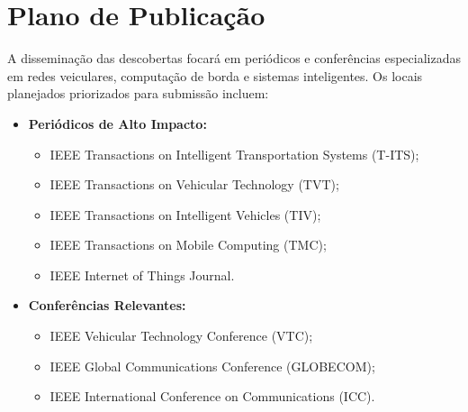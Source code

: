 \section{Plano de Publicação}
\label{sec:plano-publicacao}

A disseminação das descobertas focará em periódicos e conferências especializadas em redes veiculares, computação de borda e sistemas inteligentes. Os locais planejados priorizados para submissão incluem:

\begin{itemize}
    \item \textbf{Periódicos de Alto Impacto:}
    \begin{itemize}
        \item IEEE Transactions on Intelligent Transportation Systems (T-\gls{ITS});
        \item IEEE Transactions on Vehicular Technology (TVT);
        \item IEEE Transactions on Intelligent Vehicles (TIV);
        \item IEEE Transactions on Mobile Computing (TMC);
        \item IEEE Internet of Things Journal.
    \end{itemize}
    \item \textbf{Conferências Relevantes:}
    \begin{itemize}
        \item IEEE Vehicular Technology Conference (VTC);
        \item IEEE Global Communications Conference (GLOBECOM);
        \item IEEE International Conference on Communications (ICC).
    \end{itemize}
\end{itemize}
